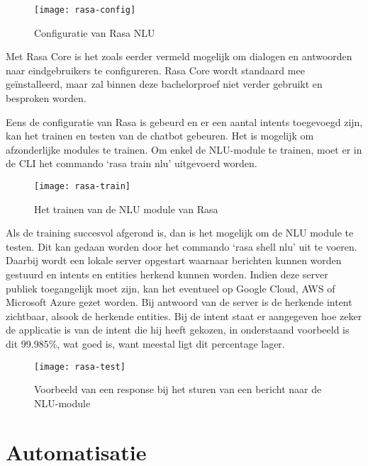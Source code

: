 \begin{figure}[H]
    \label{fig:rasa-config}
    \centering
    \texttt{[image: rasa-config]}
    \caption{Configuratie van Rasa NLU}
\end{figure}

Met Rasa Core is het zoals eerder vermeld mogelijk om dialogen en antwoorden naar eindgebruikers te configureren. Rasa Core wordt standaard mee geïnstalleerd, maar zal binnen deze bachelorproef niet verder gebruikt en besproken worden.

Eens de configuratie van Rasa is gebeurd en er een aantal intents toegevoegd zijn, kan het trainen en testen van de chatbot gebeuren. Het is mogelijk om afzonderlijke modules te trainen. Om enkel de NLU-module te trainen, moet er in de CLI het commando ‘rasa train nlu’ uitgevoerd worden.

\begin{figure}[H]
    \label{fig:rasa-train}
    \centering
    \texttt{[image: rasa-train]}
    \caption{Het trainen van de NLU module van Rasa}
\end{figure}

Als de training succesvol afgerond is, dan is het mogelijk om de NLU module te testen. Dit kan gedaan worden door het commando ‘rasa shell nlu’ uit te voeren. Daarbij wordt een lokale server opgestart waarnaar berichten kunnen worden gestuurd en intents en entities herkend kunnen worden. Indien deze server publiek toegangelijk moet zijn, kan het eventueel op Google Cloud, AWS of Microsoft Azure gezet worden. Bij antwoord van de server is de herkende intent zichtbaar, alsook de herkende entities. Bij de intent staat er aangegeven hoe zeker de applicatie is van de intent die hij heeft gekozen, in onderstaand voorbeeld is dit 99.985\%, wat goed is, want meestal ligt dit percentage lager.

\begin{figure}[H]
    \label{fig:rasa-test}
    \centering
    \texttt{[image: rasa-test]}
    \caption{Voorbeeld van een response bij het sturen van een bericht naar de NLU-module}
\end{figure}

\section{Automatisatie}
\label{sec:automatisatie}

